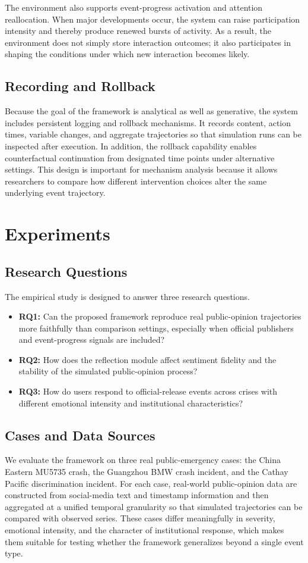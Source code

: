 \documentclass[11pt]{article}
\begin{document}
The environment also supports event-progress activation and attention reallocation. When major developments occur, the system can raise participation intensity and thereby produce renewed bursts of activity. As a result, the environment does not simply store interaction outcomes; it also participates in shaping the conditions under which new interaction becomes likely.

\subsection{Recording and Rollback}
Because the goal of the framework is analytical as well as generative, the system includes persistent logging and rollback mechanisms. It records content, action times, variable changes, and aggregate trajectories so that simulation runs can be inspected after execution. In addition, the rollback capability enables counterfactual continuation from designated time points under alternative settings. This design is important for mechanism analysis because it allows researchers to compare how different intervention choices alter the same underlying event trajectory.

\section{Experiments}

\subsection{Research Questions}
The empirical study is designed to answer three research questions.
\begin{itemize}
    \item \textbf{RQ1:} Can the proposed framework reproduce real public-opinion trajectories more faithfully than comparison settings, especially when official publishers and event-progress signals are included?
    \item \textbf{RQ2:} How does the reflection module affect sentiment fidelity and the stability of the simulated public-opinion process?
    \item \textbf{RQ3:} How do users respond to official-release events across crises with different emotional intensity and institutional characteristics?
\end{itemize}

\subsection{Cases and Data Sources}
We evaluate the framework on three real public-emergency cases: the China Eastern MU5735 crash, the Guangzhou BMW crash incident, and the Cathay Pacific discrimination incident. For each case, real-world public-opinion data are constructed from social-media text and timestamp information and then aggregated at a unified temporal granularity so that simulated trajectories can be compared with observed series. These cases differ meaningfully in severity, emotional intensity, and the character of institutional response, which makes them suitable for testing whether the framework generalizes beyond a single event type.
\end{document}
